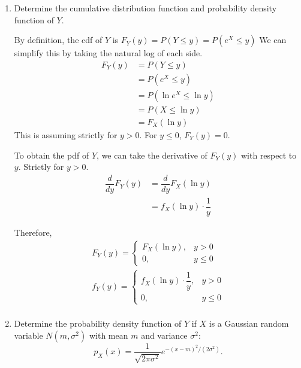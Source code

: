 \documentclass[11pt]{article}
\begin{document}
\begin{enumerate}[label=(\alph*)]
    \item Determine the cumulative distribution function and probability density function of $Y$.
    \begin{solution}

        By definition, the cdf of $Y$ is $F_Y(y) = P(Y \leq y) = P(e^X \leq y)$
        We can simplify this by taking the natural log of each side.
        \begin{align*}
            F_Y(y) &= P(Y \leq y) \\
            &= P(e^X \leq y) \\
            &= P(\ln{e^X} \leq \ln{y}) \\
            &= P(X \leq \ln{y}) \\
            &= F_X(\ln{y})
        \end{align*}
        This is assuming strictly for $y > 0$.
        For $y \leq 0$, $F_Y(y) = 0$.

        To obtain the pdf of $Y$, we can take the derivative of $F_Y(y)$ with respect to $y$.
        Strictly for $y > 0$.
        \begin{align*}
            \dfrac{d}{dy} F_Y(y) &= \dfrac{d}{dy} F_X(\ln{y}) \\
            &= f_X(\ln{y})\cdot\dfrac{1}{y}
        \end{align*}

        Therefore,
        \begin{gather*}
            F_Y(y) =
            \begin{cases}
                F_X(\ln{y}), & y > 0 \\
                0, & y \leq 0
            \end{cases}\\
            f_Y(y) =
            \begin{cases}
                f_X(\ln{y})\cdot\dfrac{1}{y}, & y > 0 \\
                0, & y \leq 0
            \end{cases}\\
        \end{gather*}
    \end{solution}

    \vspace{5em}

    \item Determine the probability density function of $Y$ if $X$ is a Gaussian random variable $N(m, \sigma^2)$ with mean $m$ and variance $\sigma^2$:
    \[
        p_X(x) = \frac{1}{\sqrt{2\pi\sigma^2}} e^{-(x-m)^2/(2\sigma^2)}.
    \]
    \begin{solution}


\end{solution}
\end{enumerate}
\end{document}

